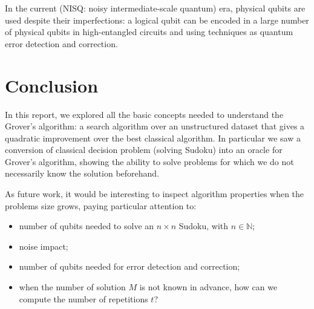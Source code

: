 \documentclass{article}
\newcommand*{\Nset}{\mathbb{N}}
\begin{document}
In the current (NISQ: noisy intermediate-scale quantum) era,
physical qubits are used despite their imperfections:
a logical qubit can be encoded in a large number of physical qubits in
high-entangled circuits and using techniques as quantum error detection and
correction.

\section{Conclusion}
In this report, we explored all the basic concepts needed to understand
the Grover's algorithm: a search algorithm over an unstructured dataset that
gives a quadratic improvement over the best classical algorithm.
In particular we saw a conversion of classical decision problem
(solving Sudoku) into an oracle for Grover's algorithm, showing the ability to
solve problems for which we do not necessarily know the solution beforehand.

As future work, it would be interesting to inspect algorithm properties
when the problems size grows, paying particular attention to:
\begin{itemize}
  \item
  number of qubits needed to solve an $n \times n$ Sudoku, with $n \in \Nset$;
  \item
  noise impact;
  \item
  number of qubits needed for error detection and correction;
  \item
  when the number of solution $M$ is not known in advance, how can we
  compute the number of repetitions $t$?
\end{itemize}
\end{document}
